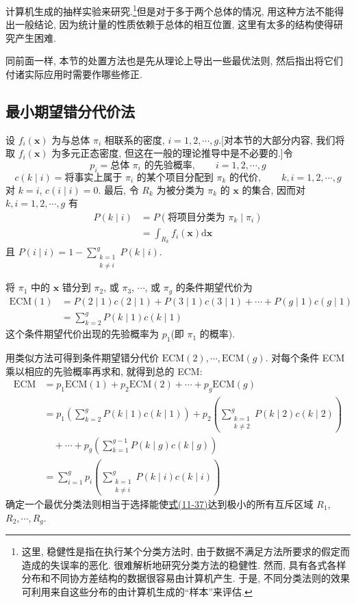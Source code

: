 
计算机生成的抽样实验来研究.\footnote{这里, 稳健性是指在执行某个分类方法时, 由于数据不满足方法所要求的假定而造成的失误率的恶化. 很难解析地研究分类方法的稳健性. 然而, 具有各式各样分布和不同协方差结构的数据很容易由计算机产生. 于是, 不同分类法则的效果可利用来自这些分布的由计算机生成的“样本”来评估.}但是对于多于两个总体的情况, 用这种方法不能得出一般结论, 因为统计量的性质依赖于总体的相互位置, 这里有太多的结构使得研究产生困难.

同前面一样, 本节的处置方法也是先从理论上导出一些最优法则, 然后指出将它们付诸实际应用时需要作哪些修正.

\subsection*{最小期望错分代价法}

设 $f_i(\mathbf{x})$ 为与总体 $\pi_i$ 相联系的密度, $i=1,2,\cdots,g$.[对本节的大部分内容, 我们将取 $f_i(\mathbf{x})$ 为多元正态密度, 但这在一般的理论推导中是不必要的.]令
\[
p_i=\text{总体 }\pi_i\text{ 的先验概率},\qquad i=1,2,\cdots,g
\]
\[
c(k\mid i)=\text{将事实上属于 }\pi_i\text{ 的某个项目分配到 }\pi_k\text{ 的代价},\qquad k,i=1,2,\cdots,g
\]
对 $k=i$, $c(i\mid i)=0$. 最后, 令 $R_k$ 为被分类为 $\pi_k$ 的 $\mathbf{x}$ 的集合, 因而对 $k,i=1,2,\cdots,g$ 有
\[
\begin{aligned}
P(k\mid i)&=P(\text{将项目分类为 }\pi_k\mid \pi_i)\\
&=\int_{R_k}f_i(\mathbf{x})\mathrm{d}\mathbf{x}
\end{aligned}
\]
且 $P(i\mid i)=1-\sum_{\substack{k=1\\k\ne i}}^{g}P(k\mid i)$.

将 $\pi_1$ 中的 $\mathbf{x}$ 错分到 $\pi_2$, 或 $\pi_3$, $\cdots$, 或 $\pi_g$ 的条件期望代价为
\[
\begin{aligned}
\mathrm{ECM}(1)&=P(2\mid 1)c(2\mid 1)+P(3\mid 1)c(3\mid 1)+\cdots+P(g\mid 1)c(g\mid 1)\\
&=\sum_{k=2}^{g}P(k\mid 1)c(k\mid 1)
\end{aligned}
\]
这个条件期望代价出现的先验概率为 $p_1$(即 $\pi_1$ 的概率).

用类似方法可得到条件期望错分代价 $\mathrm{ECM}(2),\cdots,\mathrm{ECM}(g)$. 对每个条件 ECM 乘以相应的先验概率再求和, 就得到总的 ECM:
\label{eq:11-37}
\begin{equation}
\begin{aligned}
\mathrm{ECM}&=p_1\mathrm{ECM}(1)+p_2\mathrm{ECM}(2)+\cdots+p_g\mathrm{ECM}(g)\\
&=p_1\left(\sum_{k=2}^{g}P(k\mid 1)c(k\mid 1)\right)+p_2\left(\sum_{\substack{k=1\\k\ne 2}}^{g}P(k\mid 2)c(k\mid 2)\right)\\
&\quad+\cdots+p_g\left(\sum_{k=1}^{g-1}P(k\mid g)c(k\mid g)\right)\\
&=\sum_{i=1}^{g}p_i\left(\sum_{\substack{k=1\\k\ne i}}^{g}P(k\mid i)c(k\mid i)\right)
\end{aligned}
\tag{11-37}
\end{equation}
确定一个最优分类法则相当于选择能使\hyperref[eq:11-37]{式(11-37)}达到极小的所有互斥区域 $R_1$, $R_2,\cdots,R_g$.

